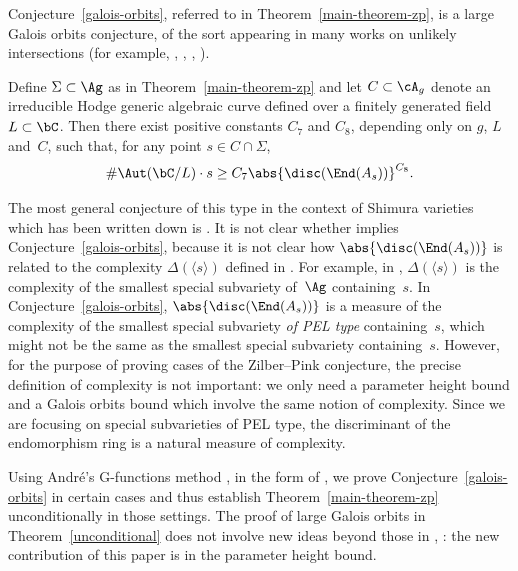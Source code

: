 Conjecture~\ref{galois-orbits}, referred to in Theorem~\ref{main-theorem-zp}, is a large Galois orbits conjecture, of the sort appearing in many works on unlikely intersections (for example, \cite[Conj.\,2.7]{Ull14}, \cite[Conj.\,8.2]{HP16}, \cite[Conj.\,11.1]{DR18}, \cite[Conj.\,6.2]{QRTUI}).

\begin{conjecture} \label{galois-orbits}
Define $\Sigma \subset \Ag$ as in Theorem~\ref{main-theorem-zp} and let $C\subset\cA_g$ denote an irreducible Hodge generic algebraic curve defined over a finitely generated field $L \subset \bC$.
Then there exist positive constants $C_{7}$ and $C_{8}$, depending only on $g$, $L$ and~$C$, such that, for any point $s \in C \cap \Sigma$,
\[
\# \Aut(\bC/L) \cdot s \geq C_{7} \abs{\disc(\End(A_s))}^{C_{8}}.
\]
\end{conjecture}

The most general conjecture of this type in the context of Shimura varieties which has been written down is \cite[Conj.\,11.1]{DR18}.
It is not clear whether \cite[Conj.\,11.1]{DR18} implies Conjecture~\ref{galois-orbits}, because it is not clear how $\abs{\disc(\End(A_s))}$ is related to the complexity $\Delta(\langle s \rangle)$ defined in \cite{DR18}.
For example, in \cite[Conj.\,11.1]{DR18}, $\Delta(\langle s \rangle)$ is the complexity of the smallest special subvariety of~$\Ag$ containing~$s$.
In Conjecture~\ref{galois-orbits}, $\abs{\disc(\End(A_s))}$ is a measure of the complexity of the smallest special subvariety \textit{of PEL type} containing~$s$, which might not be the same as the smallest special subvariety containing~$s$.
However, for the purpose of proving cases of the Zilber--Pink conjecture, the precise definition of complexity is not important: we only need a parameter height bound and a Galois orbits bound which involve the same notion of complexity. Since we are focusing on special subvarieties of PEL type, the discriminant of the endomorphism ring is a natural measure of complexity.

Using André's G-functions method \cite{And89}, in the form of \cite[Th.\,8.2]{ExCM}, we prove Conjecture~\ref{galois-orbits} in certain cases and thus establish Theorem~\ref{main-theorem-zp} unconditionally in those settings.
The proof of large Galois orbits in Theorem~\ref{unconditional} does not involve new ideas beyond those in \cite{ExCM}, \cite{QRTUI}: the new contribution of this paper is in the parameter height bound.

